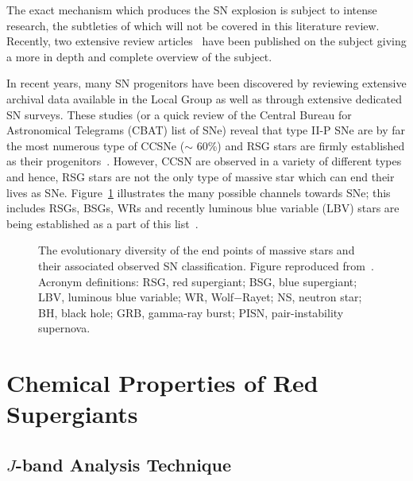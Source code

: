 The exact mechanism which produces the SN explosion is subject to intense research, the subtleties of which will not be covered in this literature review.
Recently, two extensive review articles~\citep{Janka12, Burrows13} have been published on the subject giving a more in depth and complete overview of the subject.

In recent years, many SN progenitors have been discovered by reviewing extensive archival data available in the Local Group as well as through extensive dedicated SN surveys.
These studies (or a quick review of the Central Bureau for Astronomical Telegrams (CBAT) list of SNe\footnotemark) reveal that type II-P SNe are by far the most numerous type of CCSNe ($\sim$ 60\%) and RSG stars are firmly established as their progenitors~\citep[][and references therein]{Smartt09}.
However, CCSN are observed in a variety of different types and hence, RSG stars are not the only type of massive star which can end their lives as SNe.
Figure~\ref{SNe-Smartt} illustrates the many possible channels towards SNe; this includes RSGs, BSGs, WRs and recently luminous blue variable (LBV) stars are being established as a part of this list~\citep[e.g.][]{Smartt09, Groh13}.

\begin{figure}
  \begin{center}
  \epsfxsize=150mm         %
  \caption{The evolutionary diversity of the end points of massive stars and their associated observed SN classification. Figure reproduced from~\cite{Smartt09}. Acronym definitions: RSG, red supergiant; BSG, blue supergiant; LBV, luminous blue variable; WR, Wolf$-$Rayet; NS, neutron star; BH, black hole; GRB, gamma-ray burst; PISN, pair-instability supernova.}
    \label{SNe-Smartt}
    \end{center}
 \end{figure}


\section{Chemical Properties of Red Supergiants} %
\label{sec:chemical_properties_of_red_supergiants}

\subsection{$J$-band Analysis Technique} %
\label{sub:subsection_name}

